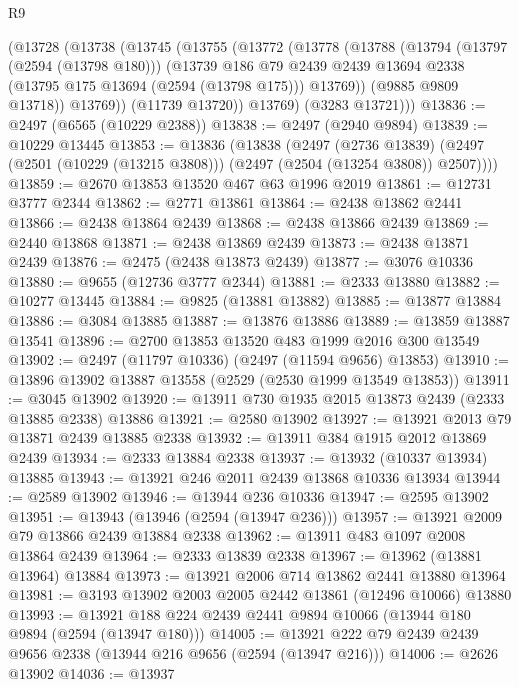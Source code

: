 \begin{lexlean}{R9}
\begin{coremodule}
    (@13728
      (@13738
        (@13745
          (@13755
            (@13772
              (@13778
                (@13788
                  (@13794
                    (@13797 (@2594 (@13798 @180)))
                    (@13739
                      @186
                      @79
                      @2439
                      @2439
                      @13694
                      @2338
                      (@13795 @175 @13694 (@2594 (@13798 @175)))
                      @13769))
                  (@9885 @9809 @13718))
                @13769))
            (@11739 @13720))
          @13769)
        (@3283 @13721)))
@13836 := @2497 (@6565 (@10229 @2388))
@13838 := @2497 (@2940 @9894)
@13839 := @10229 @13445
@13853 := @13836
    (@13838
      (@2497
        (@2736 @13839)
        (@2497 (@2501 (@10229 (@13215 @3808))) (@2497 (@2504 (@13254 @3808)) @2507))))
@13859 := @2670 @13853 @13520 @467 @63 @1996 @2019
@13861 := @12731 @3777 @2344
@13862 := @2771 @13861
@13864 := @2438 @13862 @2441
@13866 := @2438 @13864 @2439
@13868 := @2438 @13866 @2439
@13869 := @2440 @13868
@13871 := @2438 @13869 @2439
@13873 := @2438 @13871 @2439
@13876 := @2475 (@2438 @13873 @2439)
@13877 := @3076 @10336
@13880 := @9655 (@12736 @3777 @2344)
@13881 := @2333 @13880
@13882 := @10277 @13445
@13884 := @9825 (@13881 @13882)
@13885 := @13877 @13884
@13886 := @3084 @13885
@13887 := @13876 @13886
@13889 := @13859 @13887 @13541
@13896 := @2700 @13853 @13520 @483 @1999 @2016 @300 @13549
@13902 := @2497 (@11797 @10336) (@2497 (@11594 @9656) @13853)
@13910 := @13896 @13902 @13887 @13558 (@2529 (@2530 @1999 @13549 @13853))
@13911 := @3045 @13902
@13920 := @13911 @730 @1935 @2015 @13873 @2439 (@2333 @13885 @2338) @13886
@13921 := @2580 @13902
@13927 := @13921 @2013 @79 @13871 @2439 @13885 @2338
@13932 := @13911 @384 @1915 @2012 @13869 @2439
@13934 := @2333 @13884 @2338
@13937 := @13932 (@10337 @13934) @13885
@13943 := @13921 @246 @2011 @2439 @13868 @10336 @13934
@13944 := @2589 @13902
@13946 := @13944 @236 @10336
@13947 := @2595 @13902
@13951 := @13943 (@13946 (@2594 (@13947 @236)))
@13957 := @13921 @2009 @79 @13866 @2439 @13884 @2338
@13962 := @13911 @483 @1097 @2008 @13864 @2439
@13964 := @2333 @13839 @2338
@13967 := @13962 (@13881 @13964) @13884
@13973 := @13921 @2006 @714 @13862 @2441 @13880 @13964
@13981 := @3193 @13902 @2003 @2005 @2442 @13861 (@12496 @10066) @13880
@13993 := @13921 @188 @224 @2439 @2441 @9894 @10066 (@13944 @180 @9894 (@2594 (@13947 @180)))
@14005 := @13921 @222 @79 @2439 @2439 @9656 @2338 (@13944 @216 @9656 (@2594 (@13947 @216)))
@14006 := @2626 @13902
@14036 := @13937

\end{coremodule}
\end{lexlean}
